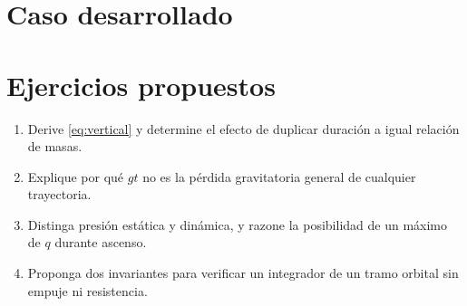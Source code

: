 \section{Caso desarrollado}

\section{Ejercicios propuestos}
\begin{enumerate}
\item Derive \eqref{eq:vertical} y determine el efecto de duplicar duración a igual relación de masas.
\item Explique por qué $gt$ no es la pérdida gravitatoria general de cualquier trayectoria.
\item Distinga presión estática y dinámica, y razone la posibilidad de un máximo de $q$ durante ascenso.
\item Proponga dos invariantes para verificar un integrador de un tramo orbital sin empuje ni resistencia.
\end{enumerate}


\studiumchaptercheck
